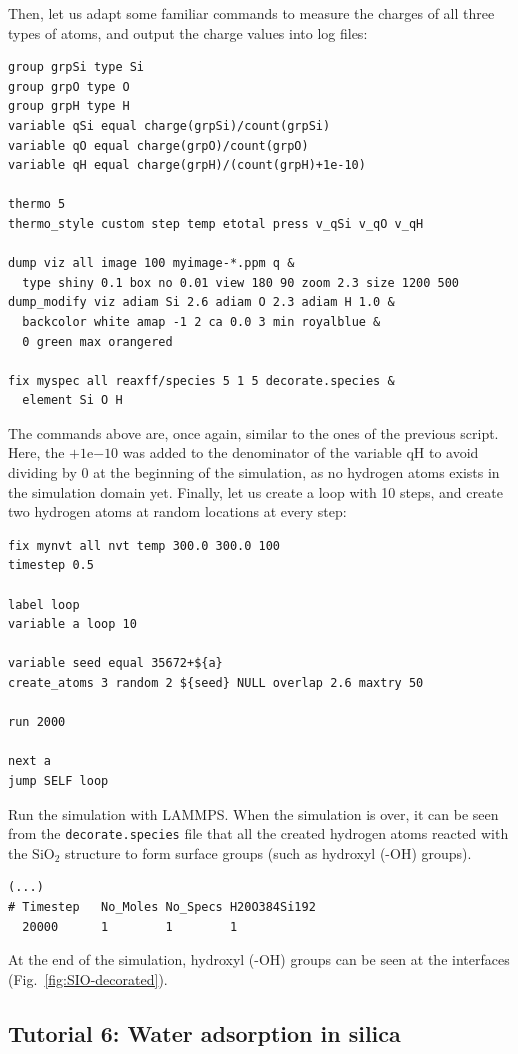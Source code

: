 \documentclass[9pt,tutorial]{livecoms}
\newcommand{\lmpcmd}[1]{\colorbox{listing}{\textcolor{command}{\small{#1}}}} %
\newcommand{\flecmd}[1]{\textcolor{command}{\texttt{#1}}} %
\begin{document}
Then, let us adapt some familiar commands to measure the charges of all three
types of atoms, and output the charge values into log files:
\begin{lstlisting}
group grpSi type Si
group grpO type O
group grpH type H
variable qSi equal charge(grpSi)/count(grpSi)
variable qO equal charge(grpO)/count(grpO)
variable qH equal charge(grpH)/(count(grpH)+1e-10)

thermo 5
thermo_style custom step temp etotal press v_qSi v_qO v_qH

dump viz all image 100 myimage-*.ppm q &
  type shiny 0.1 box no 0.01 view 180 90 zoom 2.3 size 1200 500
dump_modify viz adiam Si 2.6 adiam O 2.3 adiam H 1.0 &
  backcolor white amap -1 2 ca 0.0 3 min royalblue &
  0 green max orangered

fix myspec all reaxff/species 5 1 5 decorate.species &
  element Si O H
\end{lstlisting}
{\color{blue} The commands above are, once again, similar to the ones of the previous script.}  
Here, the $+1 \mathrm{e}{-10}$ was added to the denominator of the \lmpcmd{variable qH}
to avoid dividing by 0 at the beginning of the simulation{\color{blue}, as no hydrogen
atoms exists in the simulation domain yet}.  Finally, let us
create a loop with 10 steps, and create two hydrogen atoms at random locations at
every step:
\begin{lstlisting}
fix mynvt all nvt temp 300.0 300.0 100
timestep 0.5

label loop
variable a loop 10

variable seed equal 35672+${a}
create_atoms 3 random 2 ${seed} NULL overlap 2.6 maxtry 50

run 2000

next a
jump SELF loop
\end{lstlisting}

Run the simulation with LAMMPS.  When the simulation is over,
it can be seen from the \flecmd{decorate.species} file that
all the created hydrogen atoms reacted with the $\text{SiO}_{2}$ structure to
form surface groups (such as hydroxyl (-OH) groups).
\begin{lstlisting}
(...)
# Timestep   No_Moles No_Specs H20O384Si192
  20000      1        1        1
\end{lstlisting}
At the end of the simulation, hydroxyl (-OH) groups can be seen at the interfaces
(Fig.~\ref{fig:SIO-decorated}).

\subsection{Tutorial 6: Water adsorption in silica}
\label{gcmc-silica-label}
\end{document}

